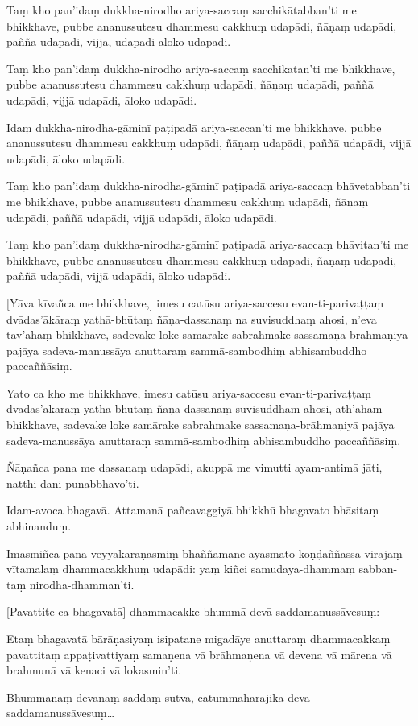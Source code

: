 Taṃ kho pan'idaṃ dukkha-nirodho ariya-saccaṃ sacchikātabban'ti me bhikkhave,
pubbe ananussutesu dhammesu cakkhuṃ udapādi, ñāṇaṃ udapādi, paññā
udapādi, vijjā, udapādi āloko udapādi.

Taṃ kho pan'idaṃ dukkha-nirodho ariya-saccaṃ sacchikatan'ti me bhikkhave,
pubbe ananussutesu dhammesu cakkhuṃ udapādi, ñāṇaṃ udapādi, paññā
udapādi, vijjā udapādi, āloko udapādi.

Idaṃ dukkha-nirodha-gāminī paṭipadā ariya-saccan'ti me bhikkhave, pubbe
ananussutesu dhammesu cakkhuṃ udapādi, ñāṇaṃ udapādi, paññā udapādi,
vijjā udapādi, āloko udapādi.

Taṃ kho pan'idaṃ dukkha-nirodha-gāminī paṭipadā ariya-saccaṃ bhāvetabban'ti
me bhikkhave, pubbe ananussutesu dhammesu cakkhuṃ udapādi, ñāṇaṃ
udapādi, paññā udapādi, vijjā udapādi, āloko udapādi.

Taṃ kho pan'idaṃ dukkha-nirodha-gāminī paṭipadā ariya-saccaṃ bhāvitan'ti me
bhikkhave, pubbe ananussutesu dhammesu cakkhuṃ udapādi, ñāṇaṃ udapādi,
paññā udapādi, vijjā udapādi, āloko udapādi.

[Yāva kīvañca me bhikkhave,] imesu catūsu ariya-saccesu evan-ti-parivaṭṭaṃ
dvādas'ākāraṃ yathā-bhūtaṃ ñāṇa-dassanaṃ na suvisuddhaṃ ahosi, n'eva tāv'āhaṃ
bhikkhave, sadevake loke samārake sabrahmake sassamaṇa-brāhmaṇiyā pajāya
sadeva-manussāya anuttaraṃ sammā-sambodhiṃ abhisambuddho paccaññāsiṃ.

Yato ca kho me bhikkhave, imesu catūsu ariya-saccesu evan-ti-parivaṭṭaṃ
dvādas'ākāraṃ yathā-bhūtaṃ ñāṇa-dassanaṃ suvisuddham ahosi, ath'āham
bhikkhave, sadevake loke samārake sabrahmake sassamaṇa-brāhmaṇiyā pajāya
sadeva-manussāya anuttaraṃ sammā-sambodhiṃ abhisambuddho paccaññāsiṃ.

Ñāṇañca pana me dassanaṃ udapādi, akuppā me vimutti ayam-antimā jāti,
natthi dāni punabbhavo'ti.

Idam-avoca bhagavā. Attamanā pañcavaggiyā bhikkhū bhagavato bhāsitaṃ
abhinanduṃ.

Imasmiñca pana veyyākaraṇasmiṃ bhaññamāne āyasmato koṇḍaññassa virajaṃ
vītamalaṃ dhammacakkhuṃ udapādi: yaṃ kiñci samudaya-dhammaṃ sabban-taṃ
nirodha-dhamman'ti.

[Pavattite ca bhagavatā] dhammacakke bhummā devā saddamanussāvesuṃ:

Etaṃ bhagavatā bārāṇasiyaṃ isipatane migadāye anuttaraṃ dhammacakkaṃ
pavattitaṃ appaṭivattiyaṃ samaṇena vā brāhmaṇena vā devena vā mārena vā
brahmunā vā kenaci vā lokasmin'ti.

Bhummānaṃ devānaṃ saddaṃ sutvā, cātummahārājikā devā
saddamanussāvesuṃ\ldots

